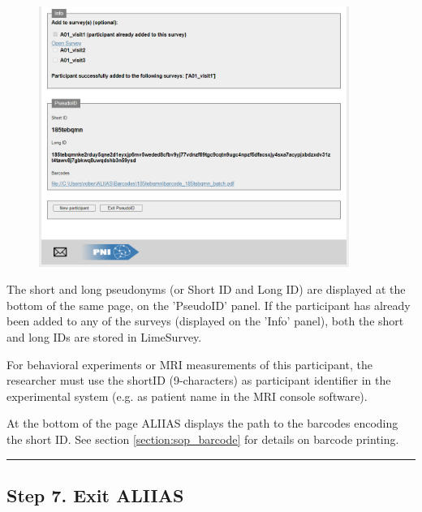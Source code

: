 \small\setlength\fboxsep{5pt}\setlength\fboxrule{1pt}

\large

\begin{figure}[H]
\includegraphics[width=0.9\textwidth]{docs/fig/05_pseudonym.PNG}
\end{figure}

The short and long pseudonyms (or Short ID and Long ID) are displayed at the bottom of the same page, on the 'PseudoID' panel. If the participant has already been added to any of the surveys (displayed on the 'Info' panel), both the short and long IDs are stored in LimeSurvey. 

For behavioral experiments or MRI measurements of this participant, the researcher must use the shortID (9-characters) as participant identifier in the experimental system (e.g. as patient name in the MRI console software).

At the bottom of the page ALIIAS displays the path to the barcodes encoding the short ID. See section \ref{section:sop_barcode} for details on barcode printing.

\par\noindent\rule{\textwidth\color{pniblue}}{0.4pt}
\subsection*{Step 7. Exit ALIIAS}

